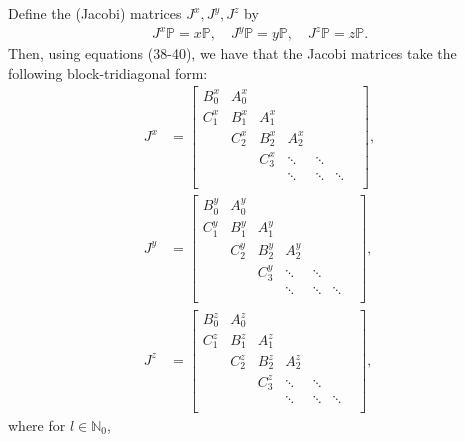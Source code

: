 \documentclass[11pt, oneside]{article}   	%
\newcommand{\No}{\mathbb{N}_0}
\newcommand{\bigP}{\mathbb{P}}
\begin{document}
Define the (Jacobi) matrices \(J^x, J^y, J^z\) by 
\begin{align}
J^x \bigP = x \bigP, \quad J^y \bigP = y \bigP, \quad J^z \bigP = z \bigP.
\end{align}
Then, using equations (38-40), we have that the Jacobi matrices take the following block-tridiagonal form:
\begin{align}
J^x &= \begin{bmatrix}
		B^x_0 & A^x_0 & & & & \\
		C^x_1 & B^x_1 & A^x_1 & & & \\
		& C^x_2 & B^x_2 & A^x_2  & & & \\
		& & C^x_3 & \ddots & \ddots & \\
		& & & \ddots & \ddots & \ddots \\
	\end{bmatrix}, \\
J^y &= \begin{bmatrix}
		B^y_0 & A^y_0 & & & & \\
		C^y_1 & B^y_1 & A^y_1 & & & \\
		& C^y_2 & B^y_2 & A^y_2  & & & \\
		& & C^y_3 & \ddots & \ddots & \\
		& & & \ddots & \ddots & \ddots \\
	\end{bmatrix}, \\
J^z &= \begin{bmatrix}
		B^z_0 & A^z_0 & & & & \\
		C^z_1 & B^z_1 & A^z_1 & & & \\
		& C^z_2 & B^z_2 & A^z_2  & & & \\
		& & C^z_3 & \ddots & \ddots & \\
		& & & \ddots & \ddots & \ddots \\
	\end{bmatrix},
\end{align}
where for \(l \in \No\),
\end{document}
